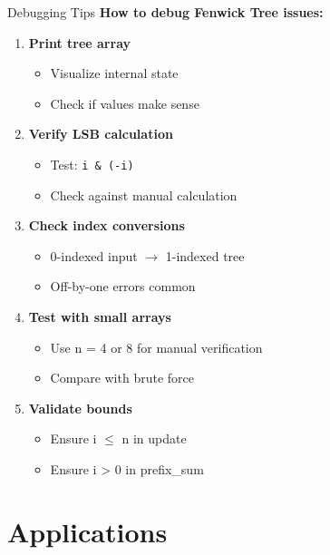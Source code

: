 \documentclass[aspectratio=169]{beamer}
\begin{document}
\begin{frame}{Debugging Tips}
  \textbf{How to debug Fenwick Tree issues:}

  \vspace{0.3cm}
  \begin{enumerate}
    \item \textbf{Print tree array}
      \begin{itemize}
        \item Visualize internal state
        \item Check if values make sense
      \end{itemize}

    \item \textbf{Verify LSB calculation}
      \begin{itemize}
        \item Test: \texttt{i \& (-i)}
        \item Check against manual calculation
      \end{itemize}

    \item \textbf{Check index conversions}
      \begin{itemize}
        \item 0-indexed input $\rightarrow$ 1-indexed tree
        \item Off-by-one errors common
      \end{itemize}

    \item \textbf{Test with small arrays}
      \begin{itemize}
        \item Use n = 4 or 8 for manual verification
        \item Compare with brute force
      \end{itemize}

    \item \textbf{Validate bounds}
      \begin{itemize}
        \item Ensure i $\leq$ n in update
        \item Ensure i > 0 in prefix\_sum
      \end{itemize}
  \end{enumerate}
\end{frame}

\section{Applications}
\end{document}

